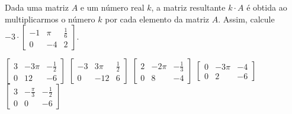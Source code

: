 Dada uma matriz $A$ e um número real $k$, a matriz resultante $k\cdot A$ é obtida ao multiplicarmos o número $k$ por cada elemento da matriz $A$. Assim, calcule $-3\cdot \left[ \begin{array}{ccc}
-1 & \pi & \frac{1}{6} \\
0 & -4 & 2
\end{array} \right]$.

$\left[ \begin{array}{ccc} 3 & -3\pi & -\frac{1}{2} \\ 0 & 12 & -6 \end{array} \right]$
$\left[ \begin{array}{ccc} -3 & 3\pi & \frac{1}{2} \\ 0 & -12 & 6 \end{array} \right]$
$\left[ \begin{array}{ccc} 2 & -2\pi & -\frac{1}{3} \\ 0 & 8 & -4 \end{array} \right]$
$\left[ \begin{array}{ccc} 0 & -3\pi & -4 \\ 0 & 2 & -6 \end{array} \right]$
$\left[ \begin{array}{ccc} 3 & -\frac{\pi}{3} & -\frac{1}{2} \\ 0 & 0 & -6 \end{array} \right]$


